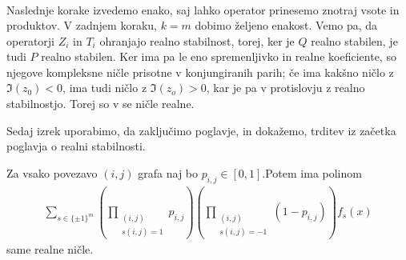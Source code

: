 \begin{dokaz}
\begin{align*}
    \end{align*}
    Naslednje korake izvedemo enako, saj lahko operator prinesemo znotraj vsote in produktov. V zadnjem koraku, \(k=m\) dobimo željeno enakost. Vemo pa, da operatorji \(Z_i\) in \(T_i\) ohranjajo realno stabilnost, torej, ker je \(Q\) realno stabilen, je tudi \(P\) realno stabilen. Ker ima pa le eno spremenljivko in realne koeficiente, so njegove kompleksne ničle prisotne v konjungiranih parih; če ima kakšno ničlo z \(\Im(z_0)<0\), ima tudi ničlo z \(\Im(z_o)>0\), kar je pa v protislovju z realno stabilnostjo. Torej so v se ničle realne.
\end{dokaz}

Sedaj izrek uporabimo, da zaključimo poglavje, in dokažemo, trditev iz začetka poglavja o realni stabilnosti.

\begin{izrek}\label{nicle-prepletenih-so-realne}
    Za vsako povezavo \((i,j)\) grafa naj bo \(p_{i,j}\in [0,1]\).Potem ima polinom
    \begin{align*}
        \sum_{s\in \{\pm 1\}^m} \left(\prod_{\substack{(i,j) \\s(i,j)=1}} p_{i,j}\right) \left(\prod_{\substack{(i,j)\\s(i,j)=-1}} (1- p_{i,j})\right) f_s(x)
    \end{align*}
    same realne ničle.
\end{izrek}
